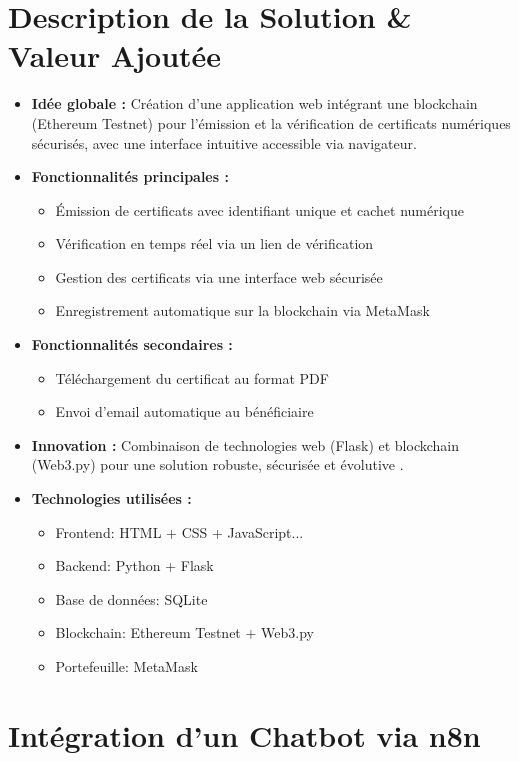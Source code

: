 \documentclass{article}
\begin{document}
\section{Description de la Solution \& Valeur Ajoutée}
\begin{itemize}
    \item \textbf{Idée globale :} Création d'une application web intégrant une blockchain (Ethereum Testnet) pour l'émission et la vérification de certificats numériques sécurisés, avec une interface intuitive accessible via navigateur.
    \item \textbf{Fonctionnalités principales :} 
    \begin{itemize}
        \item Émission de certificats avec identifiant unique et cachet numérique
        \item Vérification en temps réel via un lien de vérification
        \item Gestion des certificats via une interface web sécurisée
        \item Enregistrement automatique sur la blockchain via MetaMask
    \end{itemize}
    \item \textbf{Fonctionnalités secondaires :} 
    \begin{itemize}
        \item Téléchargement du certificat au format PDF
        \item Envoi d'email automatique au bénéficiaire
    \end{itemize}
    \item \textbf{Innovation :} Combinaison de technologies web (Flask) et blockchain (Web3.py) pour une solution robuste, sécurisée et évolutive .
    \item \textbf{Technologies utilisées :} 
    \begin{itemize}
        \item Frontend: HTML + CSS + JavaScript...
        \item Backend: Python + Flask
        \item Base de données: SQLite
        \item Blockchain: Ethereum Testnet + Web3.py
        \item Portefeuille: MetaMask

    \end{itemize}
\end{itemize}
\section{Intégration d’un Chatbot via n8n}
\end{document}

